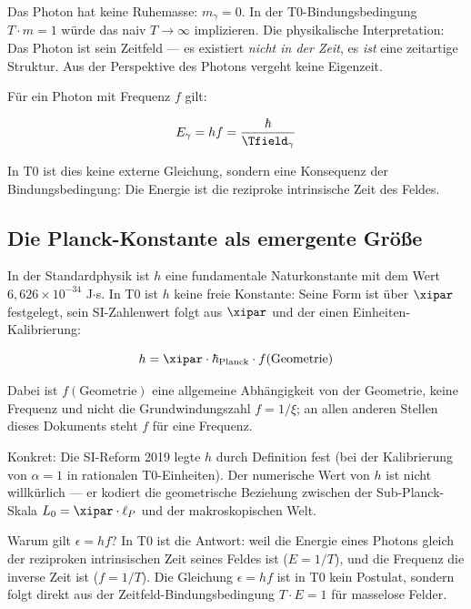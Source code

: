 Das Photon hat keine Ruhemasse: $m_\gamma = 0$. In der T0-Bindungsbedingung 
$T \cdot m = 1$ würde das naiv $T \to \infty$ implizieren. Die physikalische 
Interpretation: Das Photon ist sein Zeitfeld — es existiert \emph{nicht in der Zeit}, 
es \emph{ist} eine zeitartige Struktur. Aus der Perspektive des Photons vergeht 
keine Eigenzeit.

Für ein Photon mit Frequenz $f$ gilt:

\begin{equation}
    E_\gamma = hf = \frac{\hbar}{\Tfield_\gamma}
    \label{eq:photon_energy_t0}
\end{equation}

In T0 ist dies keine externe Gleichung, sondern eine Konsequenz der Bindungsbedingung: 
Die Energie ist die reziproke intrinsische Zeit des Feldes.

\subsection{Die Planck-Konstante als emergente Größe}

In der Standardphysik ist $h$ eine fundamentale Naturkonstante mit dem Wert 
$6{,}626 \times 10^{-34}$ J$\cdot$s. In T0 ist $h$ keine freie Konstante:
Seine Form ist über $\xipar$ festgelegt, sein SI-Zahlenwert folgt aus $\xipar$ und der
einen Einheiten-Kalibrierung:

\begin{equation}
    h = \xipar \cdot \hbar_{\text{Planck}} \cdot f(\text{Geometrie})
    \label{eq:h_from_xi}
\end{equation}

Dabei ist $f(\text{Geometrie})$ eine allgemeine Abhängigkeit von der Geometrie, keine Frequenz und nicht die Grundwindungszahl $f = 1/\xi$; an allen anderen Stellen dieses Dokuments steht $f$ für eine Frequenz.

Konkret: Die SI-Reform 2019 legte $h$ durch Definition fest (bei der Kalibrierung 
von $\alpha = 1$ in rationalen T0-Einheiten). Der numerische Wert von $h$ ist 
nicht willkürlich — er kodiert die geometrische Beziehung zwischen der 
Sub-Planck-Skala $L_0 = \xipar \cdot \ell_P$ und der makroskopischen Welt.

\begin{keyresult}
    Warum gilt $\epsilon = hf$? In T0 ist die Antwort: weil die Energie eines Photons 
    gleich der reziproken intrinsischen Zeit seines Feldes ist ($E = 1/T$), und die 
    Frequenz die inverse Zeit ist ($f = 1/T$). Die Gleichung $\epsilon = hf$ ist in T0 kein 
    Postulat, sondern folgt direkt aus der Zeitfeld-Bindungsbedingung 
    $T \cdot E = 1$ für masselose Felder.
\end{keyresult}

